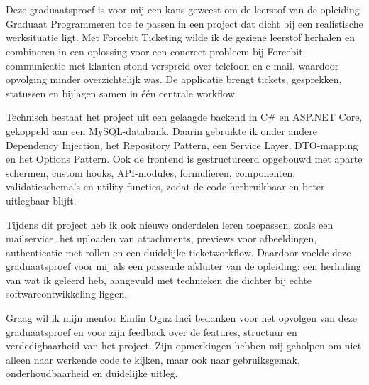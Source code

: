 ﻿%

\chapter*{}%
\label{ch:voorwoord}


Deze graduaatsproef is voor mij een kans geweest om de leerstof van de opleiding Graduaat Programmeren toe te passen in een project dat dicht bij een realistische werksituatie ligt.
Met Forcebit Ticketing wilde ik de geziene leerstof herhalen en combineren in een oplossing voor een concreet probleem bij Forcebit: communicatie met klanten stond verspreid over telefoon en e-mail, waardoor opvolging minder overzichtelijk was.
De applicatie brengt tickets, gesprekken, statussen en bijlagen samen in één centrale workflow.

\medskip

Technisch bestaat het project uit een gelaagde backend in C\# en ASP.NET Core, gekoppeld aan een MySQL-databank.
Daarin gebruikte ik onder andere Dependency Injection, het Repository Pattern, een Service Layer, DTO-mapping en het Options Pattern.
Ook de frontend is gestructureerd opgebouwd met aparte schermen, custom hooks, API-modules, formulieren, componenten, validatieschema's en utility-functies, zodat de code herbruikbaar en beter uitlegbaar blijft.

\medskip

Tijdens dit project heb ik ook nieuwe onderdelen leren toepassen, zoals een mailservice, het uploaden van attachments, previews voor afbeeldingen, authenticatie met rollen en een duidelijke ticketworkflow.
Daardoor voelde deze graduaatsproef voor mij als een passende afsluiter van de opleiding: een herhaling van wat ik geleerd heb, aangevuld met technieken die dichter bij echte softwareontwikkeling liggen.

\medskip

Graag wil ik mijn mentor Emlin Oguz Inci bedanken voor het opvolgen van deze graduaatsproef en voor zijn feedback over de features, structuur en verdedigbaarheid van het project.
Zijn opmerkingen hebben mij geholpen om niet alleen naar werkende code te kijken, maar ook naar gebruiksgemak, onderhoudbaarheid en duidelijke uitleg.

